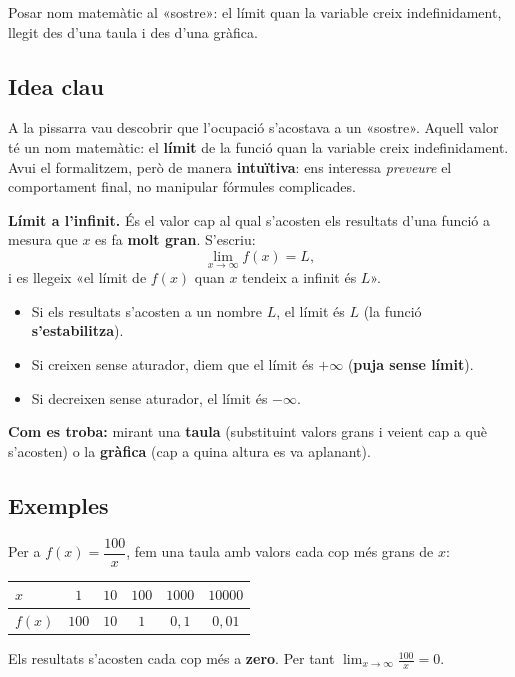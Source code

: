 %
{Posar nom matemàtic al «sostre»: el límit quan la variable creix indefinidament, llegit des d'una taula i des d'una gràfica.}

\subsection{Idea clau}

A la pissarra vau descobrir que l'ocupació s'acostava a un «sostre». Aquell valor té
un nom matemàtic: el \textbf{límit} de la funció quan la variable creix
indefinidament. Avui el formalitzem, però de manera \textbf{intuïtiva}: ens interessa
\emph{preveure} el comportament final, no manipular fórmules complicades.

\begin{idea}
\textbf{Límit a l'infinit.} És el valor cap al qual s'acosten els resultats d'una
funció a mesura que $x$ es fa \textbf{molt gran}. S'escriu:
\[
\lim_{x\to\infty} f(x)=L,
\]
i es llegeix «el límit de $f(x)$ quan $x$ tendeix a infinit és $L$».
\begin{itemize}[leftmargin=1.4em, itemsep=2pt]
  \item Si els resultats s'acosten a un nombre $L$, el límit és $L$ (la funció
        \textbf{s'estabilitza}).
  \item Si creixen sense aturador, diem que el límit és $+\infty$ (\textbf{puja sense
        límit}).
  \item Si decreixen sense aturador, el límit és $-\infty$.
\end{itemize}
\textbf{Com es troba:} mirant una \textbf{taula} (substituint valors grans i veient cap
a què s'acosten) o la \textbf{gràfica} (cap a quina altura es va aplanant).
\end{idea}

\subsection{Exemples}

\begin{exemple}
Per a $f(x)=\dfrac{100}{x}$, fem una taula amb valors cada cop més grans de $x$:
\begin{center}
\begin{tabular}{lccccc}
\toprule
$x$ & $1$ & $10$ & $100$ & $\num{1000}$ & $\num{10000}$ \\
\midrule
$f(x)$ & $100$ & $10$ & $1$ & $0,1$ & $0,01$ \\
\bottomrule
\end{tabular}
\end{center}
Els resultats s'acosten cada cop més a \textbf{zero}. Per tant
$\displaystyle\lim_{x\to\infty}\frac{100}{x}=0$.
\end{exemple}

